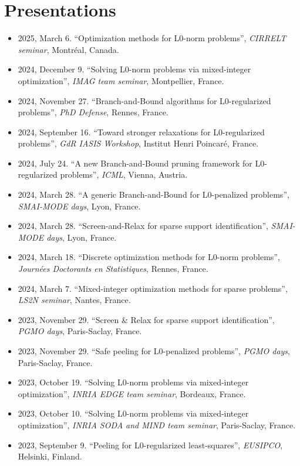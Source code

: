 \section{Presentations}

\begin{itemize}
    \item 2025, March 6. ``Optimization methods for L0-norm problems'', \textit{CIRRELT seminar}, Montréal, Canada.
    \item 2024, December 9. ``Solving L0-norm problems via mixed-integer optimization'', \textit{IMAG team seminar}, Montpellier, France.
    \item 2024, November 27. ``Branch-and-Bound algorithms for L0-regularized problems'', \textit{PhD Defense}, Rennes, France.
    \item 2024, September 16. ``Toward stronger relaxations for L0-regularized problems'', \textit{GdR IASIS Workshop}, Institut Henri Poincaré, France.
    \item 2024, July 24. ``A new Branch-and-Bound pruning framework for L0-regularized problems'', \textit{ICML}, Vienna, Austria.
    \item 2024, March 28. ``A generic Branch-and-Bound for L0-penalized problems'', \textit{SMAI-MODE days}, Lyon, France.
    \item 2024, March 28. ``Screen-and-Relax for sparse support identification'', \textit{SMAI-MODE days}, Lyon, France.
    \item 2024, March 18. ``Discrete optimization methods for L0-norm problems'', \textit{Journées Doctorants en Statistiques}, Rennes, France.
    \item 2024, March 7. ``Mixed-integer optimization methods for sparse problems'', \textit{LS2N seminar}, Nantes, France.
    \item 2023, November 29. ``Screen \& Relax for sparse support identification'', \textit{PGMO days}, Paris-Saclay, France.
    \item 2023, November 29. ``Safe peeling for L0-penalized problems'', \textit{PGMO days}, Paris-Saclay, France.
    \item 2023, October 19. ``Solving L0-norm problems via mixed-integer optimization'', \textit{INRIA EDGE team seminar}, Bordeaux, France.
    \item 2023, October 10. ``Solving L0-norm problems via mixed-integer optimization'', \textit{INRIA SODA and MIND team seminar}, Paris-Saclay, France.
    \item 2023, September 9. ``Peeling for L0-regularized least-squares'', \textit{EUSIPCO}, Helsinki, Finland.

\end{itemize}
